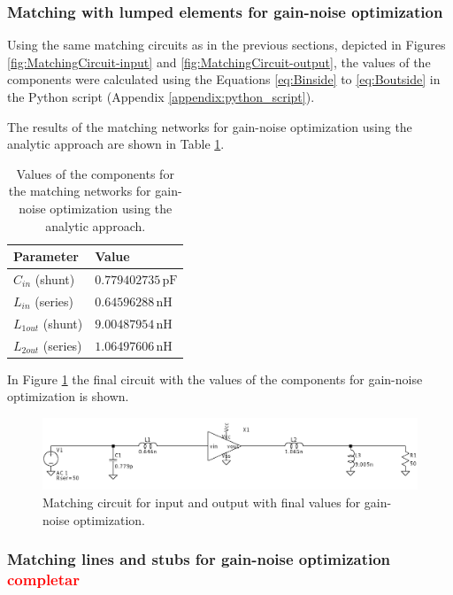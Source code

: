 \subsubsection{Matching with lumped elements for gain-noise optimization}

Using the same matching circuits as in the previous sections, depicted in Figures \ref{fig:MatchingCircuit-input} and \ref{fig:MatchingCircuit-output}, the values of the components were calculated using the Equations \ref{eq:Binside} to \ref{eq:Boutside} in the Python script (Appendix \ref{appendix:python_script}).

The results of the matching networks for gain-noise optimization using the analytic approach are shown in Table \ref{tab:MatchingValues-gain-noise}.

\begin{table}[H]
    \centering
    \caption{Values of the components for the matching networks for gain-noise optimization using the analytic approach.}
    \begin{tabularx}{\textwidth}{>{\centering\arraybackslash}X >{\centering\arraybackslash}X}
        \toprule
        \textbf{Parameter} & \textbf{Value} \\
        \midrule
        $C_{in}$ \quad (shunt)    & $0.779402735\,\si{\pico\farad}$ \\
        \midrule
        $L_{in}$  \quad(series)   & $0.64596288\,\si{\nano\henry}$\\
        \midrule
        $L_{1out}$ \quad (shunt)   & $9.00487954\,\si{\nano\henry}$ \\
        \midrule
        $L_{2out}$ \quad (series)   & $1.06497606\,\si{\nano\henry}$\\
        \bottomrule
    \end{tabularx}
    \label{tab:MatchingValues-gain-noise}
\end{table}

In Figure \ref{fig:MatchingCircuit-gain-noise} the final circuit with the values of the components for gain-noise optimization is shown.

\begin{figure}[H]
    \centering
    \includegraphics[width=1\textwidth]{Images/gain-noise-final-circuit.png}
    \caption{Matching circuit for input and output with final values for gain-noise optimization.}
    \label{fig:MatchingCircuit-gain-noise}
\end{figure}

\subsubsection{Matching lines and stubs for gain-noise optimization \textcolor{red}{completar}}